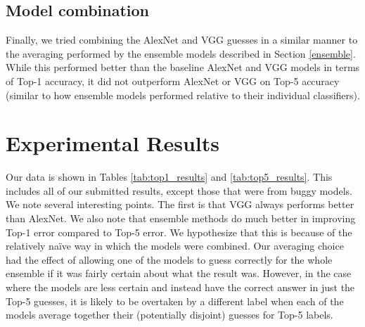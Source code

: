 \documentclass[10pt,twocolumn,letterpaper]{article}
\begin{document}
\subsection{Model combination}
Finally, we tried combining the AlexNet and VGG guesses in a similar
manner to the averaging performed by the ensemble models described
in Section \ref{ensemble}. While this performed better than the
baseline AlexNet and VGG models in terms of Top-1 accuracy, it did
not outperform AlexNet or VGG on Top-5 accuracy (similar to how
ensemble models performed relative to their individual classifiers).


\section{Experimental Results}
\label{exp_results}
Our data is shown in Tables \ref{tab:top1_results} and \ref{tab:top5_results}.  This includes all of our submitted results, except those that were from buggy models.  We note several interesting points.  The first is that VGG always performs better than AlexNet.  We also note that ensemble methods do much better in improving Top-1 error compared to Top-5 error.  We hypothesize that this is because of the relatively na\"{i}ve way in which the models were combined.  Our averaging choice had the effect of allowing one of the models to guess correctly for the whole ensemble if it was fairly certain about what the result was.  However, in the case where the models are less certain and instead have the correct answer in just the Top-5 guesses, it is likely to be overtaken by a different label when each of the models average together their (potentially disjoint)
guesses for Top-5 labels.
\end{document}
